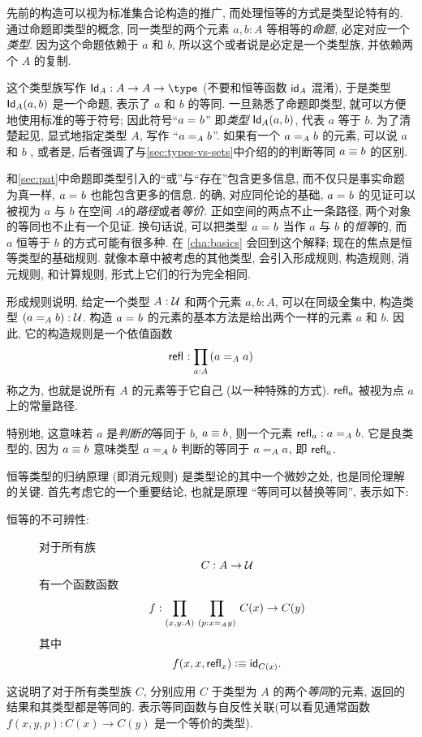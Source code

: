 %
%
%
%
先前的构造可以视为标准集合论构造的推广, 而处理恒等的方式是类型论特有的.
通过命题即类型的概念, 同一类型的两个元素 $a,b:A$ 等相等的\emph{命题}, 必定对应一个\emph{类型}.
因为这个命题依赖于 $a$ 和 $b$, 所以这个或者说是必定是一个类型族, 并依赖两个 $A$ 的复制.

这个类型族写作 $\idtypevar{A}:A\to A\to\type$ (不要和恒等函数 $\idfunc[A]$ 混淆), 于是类型 $\idtype[A]ab$ 是一个命题, 表示了 $a$ 和 $b$ 的等同.
一旦熟悉了命题即类型, 就可以方便地使用标准的等于符号;
因此符号``$\id{a}{b}$'' 即\emph{类型} $\idtype[A]ab$, 代表 $a$ 等于 $b$.
为了清楚起见, 显式地指定类型 $A$, 写作 ``$\id[A]{a}{b}$''.
如果有一个 $\id[A]{a}{b}$ 的元素, 可以说 $a$ 和 $b$ , 或者是, 后者强调了与\cref{sec:types-vs-sets}中介绍的的判断等同 $a\jdeq b$ 的区别.
%
%

和\cref{sec:pat}中命题即类型引入的``或''与``存在''包含更多信息, 而不仅只是事实命题为真一样, $\id{a}{b}$ 也能包含更多的信息.
的确, 对应同伦论的基础, $\id{a}{b}$ 的见证可以被视为 $a$ 与 $b$ 在空间 $A$的\emph{路径}或者\emph{等价}.
正如空间的两点不止一条路径, 两个对象的等同也不止有一个见证.
换句话说, 可以把类型 $\id{a}{b}$ 当作 $a$ 与 $b$ 的\emph{恒等}的, 而 $a$ 恒等于 $b$ 的方式可能有很多种.
在 \cref{cha:basics} 会回到这个解释;
现在的焦点是恒等类型的基础规则.
就像本章中被考虑的其他类型, 会引入形成规则, 构造规则, 消元规则, 和计算规则, 形式上它们的行为完全相同.

形成规则说明, 给定一个类型 $A:\UU$ 和两个元素 $a,b:A$, 可以在同级全集中, 构造类型 $(\id[A]{a}{b}):\UU$.
构造 $\id{a}{b}$ 的元素的基本方法是给出两个一样的元素 $a$ 和 $b$.
因此, 它的构造规则是一个依值函数
\[
    \refl{} : \prd{a:A} (\id[A]{a}{a})
\]
称之为,
%
也就是说所有 $A$ 的元素等于它自己 (以一种特殊的方式).
$\refl{a}$ 被视为点 $a$ 上的常量路径.

特别地, 这意味若 $a$ 是\emph{判断的}等同于 $b$, $a\jdeq b$, 则一个元素 $\refl{a} : \id[A]{a}{b}$.
它是良类型的, 因为 $a\jdeq b$ 意味类型 $\id[A]{a}{b}$ 判断的等同于 $\id[A]{a}{a}$, 即 $\refl{a}$.

恒等类型的归纳原理 (即消元规则) 是类型论的其中一个微妙之处, 也是同伦理解的关键.
首先考虑它的一个重要结论, 也就是原理 ``等同可以替换等同'', 表示如下: %
%
\begin{description}
    \item[恒等的不可辨性:]
    对于所有族
    \[
        C : A \to \UU
    \]
    有一个函数函数
    \[
        f : \prd{x,y:A}{p:\id[A] x y} C(x) \to C(y)
    \]
    其中
    \[
        f(x,x,\refl{x}) \defeq \idfunc[C(x)].
    \]
\end{description}
这说明了对于所有类型族 $C$, 分别应用 $C$ 于类型为 $A$ 的两个\emph{等同}的元素, 返回的结果和其类型都是等同的.
表示等同函数与自反性关联(可以看见通常函数 $f(x,y,p): C(x) \to C(y)$ 是一个等价的类型).

